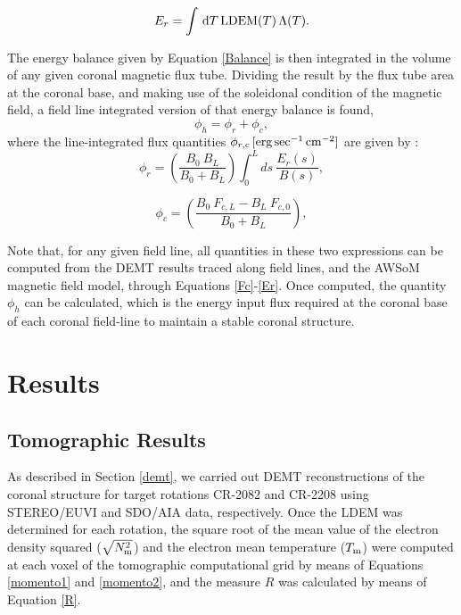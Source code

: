 \documentclass[namedreferences]{solarphysics}
\newcommand{\LDEM}{{\rm LDEM}}
\newcommand{\Tm}{T_{\rm m}}
\newcommand{\Nsqm}{N^2_{{\rm m}}}
\newcommand{\sqravgN}{\sqrt{\Nsqm}}
\begin{document}
\begin{article}
\begin{equation}\label{Er}
E_r = \int\,\textrm{d}T\,\LDEM(T)\,\Lambda(T).
\end{equation}

{The energy balance given by Equation \ref{Balance} is then integrated in the volume of any given coronal magnetic flux tube. Dividing the result by the flux tube area at the coronal base, and making use of the soleidonal condition of the magnetic field, a {field line integrated} version of that energy balance is found,
\begin{equation}\label{FluxBalance}
\phi_h = \phi_r + \phi_c,
\end{equation}
\noindent
where the {line-integrated} flux quantities $\phi_{r,c}\,[\rm{erg\,sec^{-1}\,cm^{-2}}]$ are given by \citep{maccormack_2017}:} \\


\begin{equation}\label{phi_r}
\phi_r = \left( \frac{B_0 \ B_L}{B_0 + B_L} \right) \int_{0}^{L} ds \ \frac{E_r(s)}{B(s)},
\end{equation}

\begin{equation}\label{phi_c}
\phi_c = \left( \frac{B_0 \ F_{c,L} - B_L \ F_{c,0}}{B_0 + B_L} \right) ,
\end{equation}


 {Note that, for any given field line, all quantities in these two expressions can be computed {from the DEMT results traced along field lines, and the AWSoM magnetic field model,} through Equations \ref{Fc}-\ref{Er}. Once computed, the quantity $\phi_h$ can be calculated, which is the energy input flux required at the coronal base of each coronal field-line to maintain a stable coronal structure.}

\section{Results}\label{resu} 

\subsection{Tomographic Results}\label{demt_res} 

{As described in Section \ref{demt}, we carried out DEMT reconstructions of the coronal structure for target rotations CR-2082 and CR-2208 using STEREO/EUVI and SDO/AIA data, respectively.} {Once the LDEM was determined for each rotation, the square root of the mean value of the electron density squared ($\sqravgN$) and the electron mean temperature ($\Tm$) were computed at each voxel of the tomographic computational grid by means of Equations \ref{momento1} and \ref{momento2}{, and the measure $R$ was calculated by means of Equation \ref{R}.}} 


\end{article}
\end{document}

